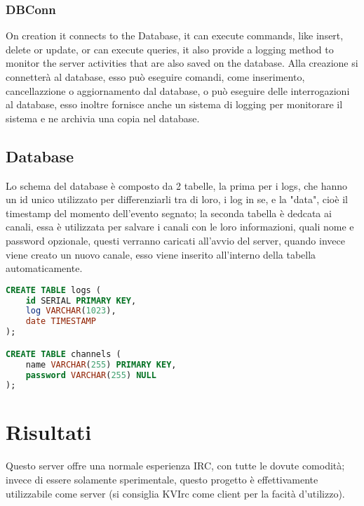 \documentclass{article}
\begin{document}
\subsubsection{DBConn}
On creation it connects to the Database, it can execute commands, like insert, delete or update, or can execute queries, it also provide a logging method to monitor the server activities that are also saved on the database.
Alla creazione si connetterà al database, esso può eseguire comandi, come inserimento, cancellazzione o aggiornamento dal database, o può eseguire delle interrogazioni al database, esso inoltre fornisce anche un sistema di logging per monitorare il sistema e ne archivia una copia nel database.


\vspace{12pt}
\subsection{Database}
Lo schema del database è composto da 2 tabelle, la prima per i logs, che hanno un id unico utilizzato per differenziarli tra di loro, i log in se, e la "data", cioè il timestamp del momento dell'evento segnato; la seconda tabella è dedcata ai canali, essa è utilizzata per salvare i canali con le loro informazioni, quali nome e password opzionale, questi verranno caricati all'avvio del server, quando invece viene creato un nuovo canale, esso viene inserito all'interno della tabella automaticamente.
\begin{lstlisting}[language=SQL, caption={DB Schema}, label={DB Schema}]
CREATE TABLE logs (
	id SERIAL PRIMARY KEY,
	log VARCHAR(1023),
	date TIMESTAMP
);

CREATE TABLE channels (
	name VARCHAR(255) PRIMARY KEY,
	password VARCHAR(255) NULL
);
\end{lstlisting}


\newpage



\section{Risultati}
Questo server offre una normale esperienza IRC, con tutte le dovute comodità; invece di essere solamente sperimentale, questo progetto è effettivamente utilizzabile come server (si consiglia KVIrc come client per la facità d'utilizzo).
\end{document}
